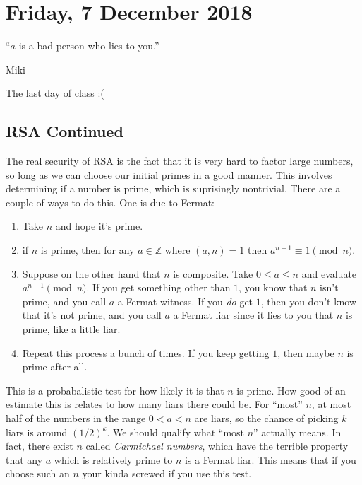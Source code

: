\section{Friday, 7 December 2018}

\epigraph{``$a$ is a bad person who lies to you.''}{Miki}

The last day of class :(

\subsection{RSA Continued}

The real security of RSA is the fact that it is very hard to factor large numbers, so long as we can choose our initial primes in a good manner. This involves determining if a number is prime, which is suprisingly nontrivial. There are a couple of ways to do this. One is due to Fermat:
\begin{enumerate}
\item Take $n$ and hope it's prime.
\item if $n$ is prime, then for any $a \in \mathbb{Z}$ where $(a,n) = 1$ then $a^{n-1} \equiv 1 \pmod{n}$.
\item Suppose on the other hand that $n$ is composite. Take $0 \leq a \leq n$ and evaluate $a^{n-1} \pmod{n}$. If you get something other than $1$, you know that $n$ isn't prime, and you call $a$ a Fermat witness. If you \emph{do} get $1$, then you don't know that it's not prime, and you call $a$ a Fermat liar since it lies to you that $n$ is prime, like a little liar.
\item Repeat this process a bunch of times. If you keep getting $1$, then maybe $n$ is prime after all.
\end{enumerate}
This is a probabalistic test for how likely it is that $n$ is prime. How good of an estimate this is relates to how many liars there could be. For ``most'' $n$, at most half of the numbers in the range $0 < a < n$ are liars, so the chance of picking $k$ liars is around $(1/2)^k$. We should qualify what ``most $n$'' actually means. In fact, there exist $n$ called \emph{Carmichael numbers}, which have the terrible property that any $a$ which is relatively prime to $n$ is a Fermat liar. This means that if you choose such an $n$ your kinda screwed if you use this test.

